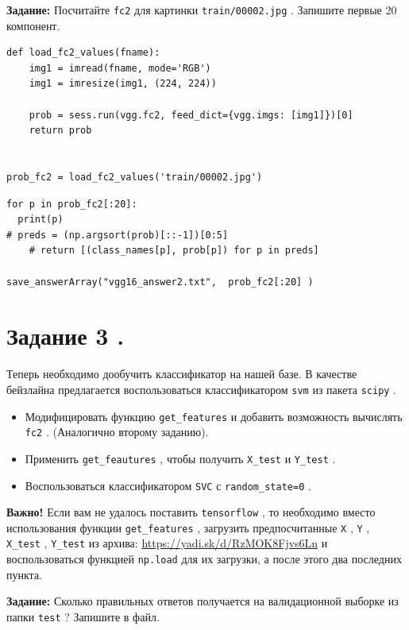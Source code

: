\documentclass[11pt,a4paper]{article}
\begin{document}
\textbf{Задание:} Посчитайте \texttt{fc2} для картинки \texttt{train/00002.jpg} .  Запишите первые 20 компонент.

\begin{verbatim}
def load_fc2_values(fname):
    img1 = imread(fname, mode='RGB')
    img1 = imresize(img1, (224, 224))
    
    prob = sess.run(vgg.fc2, feed_dict={vgg.imgs: [img1]})[0]
    return prob
    

prob_fc2 = load_fc2_values('train/00002.jpg')
\end{verbatim}

\begin{verbatim}
for p in prob_fc2[:20]:
  print(p)
# preds = (np.argsort(prob)[::-1])[0:5]
    # return [(class_names[p], prob[p]) for p in preds]
   
save_answerArray("vgg16_answer2.txt",  prob_fc2[:20] )
\end{verbatim}

\section{Задание 3 .}

Теперь необходимо дообучить классификатор на нашей базе. В качестве бейзлайна предлагается воспользоваться классификатором \texttt{svm} из пакета \texttt{scipy} .

\begin{itemize}
\item Модифицировать функцию \texttt{get_features} и добавить возможность вычислять \texttt{fc2} . (Аналогично второму заданию).
\item Применить \texttt{get_feautures} , чтобы получить \texttt{X_test} и \texttt{Y_test} .
\item Воспользоваться классификатором \texttt{SVC} с \texttt{random_state=0} .
\end{itemize}

\textbf{Важно!} Если вам не удалось поставить \texttt{tensorflow} , то необходимо вместо использования функции \texttt{get_features} , загрузить предпосчитанные \texttt{X} , \texttt{Y} , \texttt{X_test} , \texttt{Y_test} из архива: \href{https://yadi.sk/d/RzMOK8Fjvs6Ln}{https://yadi.sk/d/RzMOK8Fjvs6Ln} и воспользоваться функцией \texttt{np.load} для их загрузки, а после этого два последних пункта.

\textbf{Задание:} Сколько правильных ответов получается на валидационной выборке из папки \texttt{test} ? Запишите в файл.
\end{document}
